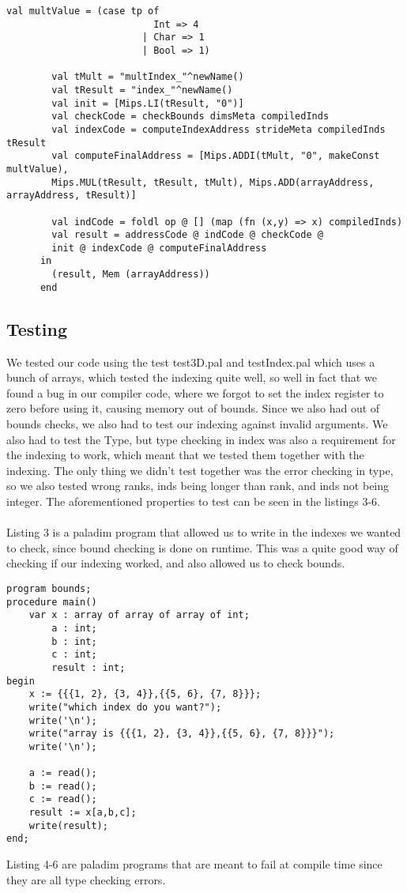 \begin{lstlisting}[style=MLStyle, caption=Implementation of indexing for the compiler]
        val multValue = (case tp of
                          Int => 4
                        | Char => 1
                        | Bool => 1)
                          
        val tMult = "multIndex_"^newName()
        val tResult = "index_"^newName()
        val init = [Mips.LI(tResult, "0")]
        val checkCode = checkBounds dimsMeta compiledInds 
        val indexCode = computeIndexAddress strideMeta compiledInds tResult 
        val computeFinalAddress = [Mips.ADDI(tMult, "0", makeConst multValue),
        Mips.MUL(tResult, tResult, tMult), Mips.ADD(arrayAddress, arrayAddress, tResult)] 
  
        val indCode = foldl op @ [] (map (fn (x,y) => x) compiledInds)
        val result = addressCode @ indCode @ checkCode @ 
        init @ indexCode @ computeFinalAddress 
      in
        (result, Mem (arrayAddress)) 
      end	
\end{lstlisting}



\subsection{Testing}
We tested our code using the test test3D.pal and testIndex.pal which uses a bunch of arrays, which tested the indexing quite well, 
so well in fact that we found a bug in our compiler code, where we forgot to set the index register to zero before using it, 
causing memory out of bounds. Since we also had out of bounds checks, we also had to test our indexing against invalid arguments. 
We also had to test the Type, but type checking in index was also a requirement for the indexing to work, 
which meant that we tested them together with the indexing. The only thing we didn't test together was the error checking in type, 
so we also tested wrong ranks, inds being longer than rank, and inds not being integer. The aforementioned properties to test can be
seen in the listings 3-6.
\\
\\
Listing 3 is a paladim program that allowed us to write in the indexes we wanted to check, since bound checking is done on runtime. This was
a quite good way of checking if our indexing worked, and also allowed us to check bounds.

\begin{lstlisting}[style=paladim, caption=testIndexBounds.pal tests bounds]
program bounds;
procedure main()
    var x : array of array of array of int;
        a : int;
        b : int;
        c : int;
        result : int;
begin
    x := {{{1, 2}, {3, 4}},{{5, 6}, {7, 8}}};
    write("which index do you want?");
    write('\n');
    write("array is {{{1, 2}, {3, 4}},{{5, 6}, {7, 8}}}");
    write('\n');

    a := read();
    b := read();
    c := read();
    result := x[a,b,c];
    write(result);
end;
\end{lstlisting}
Listing 4-6 are paladim programs that are meant to fail at compile time since they are all type checking errors.

